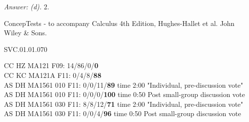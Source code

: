 {\it Answer: (d).} 2.

\medskip
ConcepTests - to accompany Calculus 4th Edition, Hughes-Hallet et al. John Wiley \& Sons.

SVC.01.01.070


CC HZ MA121 F09: 14/86/0/{\bf 0}  \\
CC KC MA121A F11: 0/4/8/{\bf88}  \\
AS DH MA1561 010 F11: 0/0/11/{\bf89} time 2:00 "Individual, pre-discussion vote" \\
AS DH MA1561 010 F11: 0/0/0/{\bf100} time 0:50 Post small-group discussion vote \\
AS DH MA1561 030 F11: 8/8/12/{\bf71} time 2:00 "Individual, pre-discussion vote" \\
AS DH MA1561 030 F11: 0/0/4/{\bf96} time 0:50 Post small-group discussion vote \\
